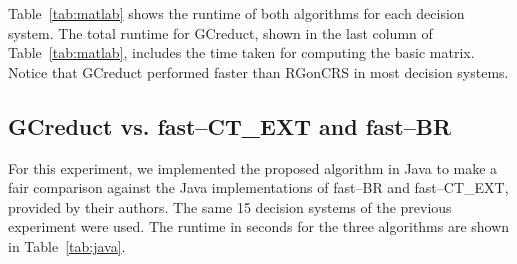 \documentclass[number,preprint,review,12pt]{elsarticle}
\begin{document}
	Table~\ref{tab:matlab} shows the runtime of both algorithms for each decision system. The total runtime for GCreduct, shown in the last column of Table~\ref{tab:matlab}, includes the time taken for computing the basic matrix. Notice that GCreduct performed faster than RGonCRS in most decision systems.

\subsection{GCreduct vs. fast--CT\_EXT and fast--BR}\label{sub:java}
	
	For this experiment, we implemented the proposed algorithm in Java to make a fair comparison against the Java implementations of fast--BR and fast--CT\_EXT, provided by their authors. The same 15 decision systems of the previous experiment were used. The runtime in seconds for the three algorithms are shown in Table~\ref{tab:java}.
	
\end{document}
